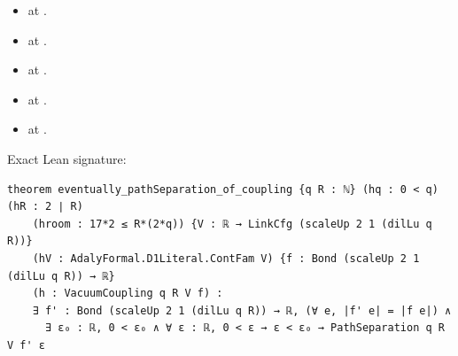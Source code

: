 \begin{theorem}[bp-107]
\begin{itemize}
\item \texttt{} at \texttt{}.
\item \texttt{} at \texttt{}.
\item \texttt{} at \texttt{}.
\item \texttt{} at \texttt{}.
\item \texttt{} at \texttt{}.
\end{itemize}
\par Exact Lean signature:
\begin{verbatim}
theorem eventually_pathSeparation_of_coupling {q R : ℕ} (hq : 0 < q) (hR : 2 ∣ R)
    (hroom : 17*2 ≤ R*(2*q)) {V : ℝ → LinkCfg (scaleUp 2 1 (dilLu q R))}
    (hV : AdalyFormal.D1Literal.ContFam V) {f : Bond (scaleUp 2 1 (dilLu q R)) → ℝ}
    (h : VacuumCoupling q R V f) :
    ∃ f' : Bond (scaleUp 2 1 (dilLu q R)) → ℝ, (∀ e, |f' e| = |f e|) ∧
      ∃ ε₀ : ℝ, 0 < ε₀ ∧ ∀ ε : ℝ, 0 < ε → ε < ε₀ → PathSeparation q R V f' ε
\end{verbatim}
\end{theorem}

